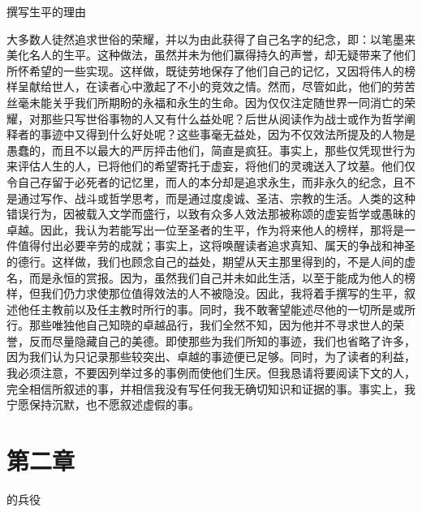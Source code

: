 撰写生平的理由\par

大多数人徒然追求世俗的荣耀，并以为由此获得了自己名字的纪念，即：以笔墨来美化名人的生平。这种做法，虽然并未为他们赢得持久的声誉，却无疑带来了他们所怀希望的一些实现。这样做，既徒劳地保存了他们自己的记忆，又因将伟人的榜样呈献给世人，在读者心中激起了不小的竞效之情。然而，尽管如此，他们的劳苦丝毫未能关乎我们所期盼的永福和永生的生命。因为仅仅注定随世界一同消亡的荣耀，对那些只写世俗事物的人又有什么益处呢？后世从阅读作为战士或作为哲学阐释者的事迹中又得到什么好处呢？这些事毫无益处，因为不仅效法所提及的人物是愚蠢的，而且不以最大的严厉抨击他们，简直是疯狂。事实上，那些仅凭现世行为来评估人生的人，已将他们的希望寄托于虚妄，将他们的灵魂送入了坟墓。他们仅令自己存留于必死者的记忆里，而人的本分却是追求永生，而非永久的纪念，且不是通过写作、战斗或哲学思考，而是通过度虔诚、圣洁、宗教的生活。人类的这种错误行为，因被载入文学而盛行，以致有众多人效法那被称颂的虚妄哲学或愚昧的卓越。因此，我认为若能写出一位至圣者的生平，作为将来他人的榜样，那将是一件值得付出必要辛劳的成就；事实上，这将唤醒读者追求真知、属天的争战和神圣的德行。这样做，我们也顾念自己的益处，期望从天主那里得到的，不是人间的虚名，而是永恒的赏报。因为，虽然我们自己并未如此生活，以至于能成为他人的榜样，但我们仍力求使那位值得效法的人不被隐没。因此，我将着手撰写的生平，叙述他任主教前以及任主教时所行的事。同时，我不敢奢望能述尽他的一切所是或所行。那些唯独他自己知晓的卓越品行，我们全然不知，因为他并不寻求世人的荣誉，反而尽量隐藏自己的美德。即使那些为我们所知的事迹，我们也省略了许多，因为我们认为只记录那些较突出、卓越的事迹便已足够。同时，为了读者的利益，我必须注意，不要因列举过多的事例而使他们生厌。但我恳请将要阅读下文的人，完全相信所叙述的事，并相信我没有写任何我无确切知识和证据的事。事实上，我宁愿保持沉默，也不愿叙述虚假的事。\par


\section{第二章}

的兵役\par

